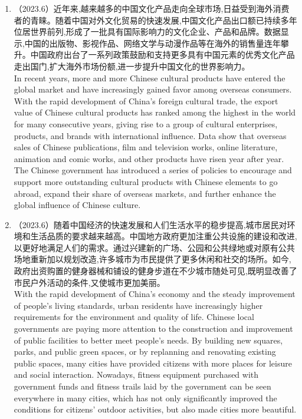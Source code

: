 ﻿\documentclass[lang=cn,11pt]{elegantbook}
\begin{document}
\begin{enumerate}
    \item （2023.6）近年来,越来越多的中国文化产品走向全球市场,日益受到海外消费者的青睐。随着中国对外文化贸易的快速发展,中国文化产品出口额已持续多年位居世界前列,形成了一批具有国际影响力的文化企业、产品和品牌。数据显示,中国的出版物、影视作品、网络文学与动漫作品等在海外的销售量连年攀升。中国政府出台了一系列政策鼓励和支持更多具有中国元素的优秀文化产品走出国门,扩大海外市场份额,进一步提升中国文化的世界影响力。\\In recent years, more and more Chinese cultural products have entered the global market and have increasingly gained favor among overseas consumers. With the rapid development of China’s foreign cultural trade, the export value of Chinese cultural products has ranked among the highest in the world for many consecutive years, giving rise to a group of cultural enterprises, products, and brands with international influence. Data show that overseas sales of Chinese publications, film and television works, online literature, animation and comic works, and other products have risen year after year. The Chinese government has introduced a series of policies to encourage and support more outstanding cultural products with Chinese elements to go abroad, expand their share of overseas markets, and further enhance the global influence of Chinese culture.
    \item （2023.6）随着中国经济的快速发展和人们生活水平的稳步提高,城市居民对环境和生活品质的要求越来越高。中国地方政府更加注重公共设施的建设和改进,以更好地满足人们的需求。通过兴建新的广场、公园和公共绿地或对原有公共场地重新加以规划改造,许多城市为市民提供了更多休闲和社交的场所。如今,政府出资购置的健身器械和铺设的健身步道在不少城市随处可见,既明显改善了市民户外活动的条件,又使城市更加美丽。\\With the rapid development of China’s economy and the steady improvement of people’s living standards, urban residents have increasingly higher requirements for the environment and quality of life. Chinese local governments are paying more attention to the construction and improvement of public facilities to better meet people’s needs. By building new squares, parks, and public green spaces, or by replanning and renovating existing public spaces, many cities have provided citizens with more places for leisure and social interaction. Nowadays, fitness equipment purchased with government funds and fitness trails laid by the government can be seen everywhere in many cities, which has not only significantly improved the conditions for citizens’ outdoor activities, but also made cities more beautiful.

\end{enumerate}
\end{document}
